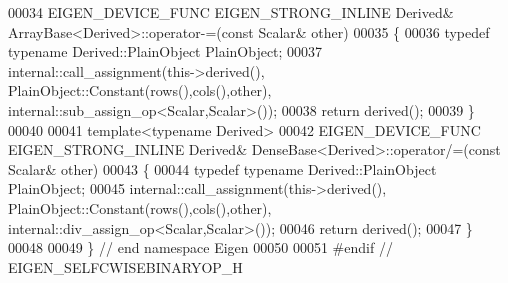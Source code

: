 \begin{DoxyCode}
00034 EIGEN\_DEVICE\_FUNC EIGEN\_STRONG\_INLINE Derived& ArrayBase<Derived>::operator-=(\textcolor{keyword}{const} Scalar& other)
00035 \{
00036   \textcolor{keyword}{typedef} \textcolor{keyword}{typename} Derived::PlainObject PlainObject;
00037   internal::call\_assignment(this->derived(), PlainObject::Constant(rows(),cols(),other), 
      internal::sub\_assign\_op<Scalar,Scalar>());
00038   \textcolor{keywordflow}{return} derived();
00039 \}
00040 
00041 \textcolor{keyword}{template}<\textcolor{keyword}{typename} Derived>
00042 EIGEN\_DEVICE\_FUNC EIGEN\_STRONG\_INLINE Derived& DenseBase<Derived>::operator/=(\textcolor{keyword}{const} Scalar& other)
00043 \{
00044   \textcolor{keyword}{typedef} \textcolor{keyword}{typename} Derived::PlainObject PlainObject;
00045   internal::call\_assignment(this->derived(), PlainObject::Constant(rows(),cols(),other), 
      internal::div\_assign\_op<Scalar,Scalar>());
00046   \textcolor{keywordflow}{return} derived();
00047 \}
00048 
00049 \} \textcolor{comment}{// end namespace Eigen}
00050 
00051 \textcolor{preprocessor}{#endif // EIGEN\_SELFCWISEBINARYOP\_H}
\end{DoxyCode}
